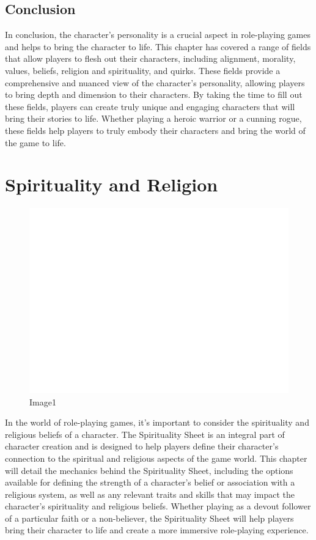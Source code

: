 \hypertarget{conclusion}{%
\subsection{Conclusion}\label{conclusion}}

In conclusion, the character's personality is a crucial aspect in
role-playing games and helps to bring the character to life. This
chapter has covered a range of fields that allow players to flesh out
their characters, including alignment, morality, values, beliefs,
religion and spirituality, and quirks. These fields provide a
comprehensive and nuanced view of the character's personality, allowing
players to bring depth and dimension to their characters. By taking the
time to fill out these fields, players can create truly unique and
engaging characters that will bring their stories to life. Whether
playing a heroic warrior or a cunning rogue, these fields help players
to truly embody their characters and bring the world of the game to
life.

\hypertarget{spirituality-and-religion}{%
\section{Spirituality and Religion}\label{spirituality-and-religion}}

\begin{figure}
\centering
\includegraphics{./images/religion01.svg}
\caption{Image1}
\end{figure}

In the world of role-playing games, it's important to consider the
spirituality and religious beliefs of a character. The Spirituality
Sheet is an integral part of character creation and is designed to help
players define their character's connection to the spiritual and
religious aspects of the game world. This chapter will detail the
mechanics behind the Spirituality Sheet, including the options available
for defining the strength of a character's belief or association with a
religious system, as well as any relevant traits and skills that may
impact the character's spirituality and religious beliefs. Whether
playing as a devout follower of a particular faith or a non-believer,
the Spirituality Sheet will help players bring their character to life
and create a more immersive role-playing experience.

